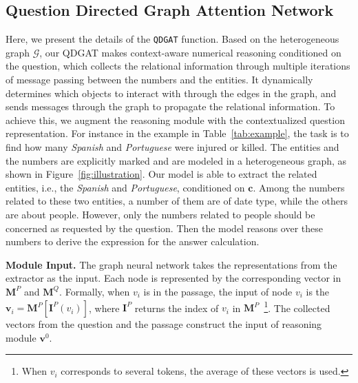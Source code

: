 \documentclass{article}
\begin{document}
\subsection{Question Directed Graph Attention Network}
Here, we present the details of the \texttt{QDGAT} function.
Based on the heterogeneous graph $\mathcal{G}$, our QDGAT makes context-aware numerical reasoning conditioned on the question, which collects the relational information through multiple iterations of message passing between the numbers and the entities.
It dynamically determines which objects to interact with through the edges in the graph, and sends messages through the graph to propagate the relational information.
To achieve this, we augment the reasoning module with the contextualized question representation.
For instance in the example in Table~\ref{tab:example}, the task is to find how many \emph{Spanish} and \emph{Portuguese} were injured or killed.
The entities and the numbers are explicitly marked and are modeled in a heterogeneous graph, as shown in Figure~\ref{fig:illustration}. 
Our model is able to extract the related entities, i.e., the \emph{Spanish} and \emph{Portuguese}, conditioned on $\mathbf{c}$.
Among the numbers related to these two entities, a number of them are of date type, while the others are about people.
However, only the numbers related to people should be concerned as requested by the question. 
Then the model reasons over these numbers to derive the expression for the answer calculation.


{\bf Module Input.}
The graph neural network takes the representations from the extractor as the input.
Each node is represented by the corresponding vector in $\mathbf{M}^P$ and $\mathbf{M}^Q$. 
Formally, when $v_i$ is in the passage, the input of node $v_i$ is the $\mathbf{v}_i = \mathbf{M}^{P}[\mathbf{I}^P(v_i)]$, where $\mathbf{I}^P$ returns the index of $v_i$ in $\mathbf{M}^P$~\footnote{When $v_i$ corresponds to several tokens, the average of these vectors is used.}.
The collected vectors from the question and the passage construct the input of reasoning module $\mathbf{v}^0$.
\end{document}
